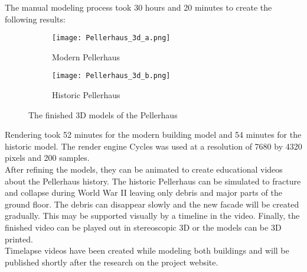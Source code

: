 The manual modeling process took 30 hours and 20 minutes to create the following results:

\begin{figure}[h]
	\centering
	\begin{subfigure}[b]{0.75\textwidth}
		\centering
		\texttt{[image: Pellerhaus\_3d\_a.png]}
		\caption{Modern Pellerhaus}
		\label{fig:pellerhaus_3d_modern}
	\end{subfigure}
	\hfill
	\begin{subfigure}[b]{0.75\textwidth}
		\centering
		\texttt{[image: Pellerhaus\_3d\_b.png]}
		\caption{Historic Pellerhaus}
		\label{fig:pellerhaus_3d_historic}
	\end{subfigure}
	\caption{The finished 3D models of the Pellerhaus}
	\label{fig:pellerhaus_3d_models}
\end{figure}

Rendering took 52 minutes for the modern building model and 54 minutes for the historic model. The render engine Cycles was used at a resolution of 7680 by 4320 pixels and 200 samples.\\

After refining the models, they can be animated to create educational videos about the Pellerhaus history. The historic Pellerhaus can be simulated to fracture and collapse during World War II leaving only debris and major parts of the ground floor. The debris can disappear slowly and the new facade will be created gradually. This may be supported visually by a timeline in the video. Finally, the finished video can be played out in stereoscopic 3D or the models can be 3D printed.\\

Timelapse videos have been created while modeling both buildings and will be published shortly after the research on the project website.
